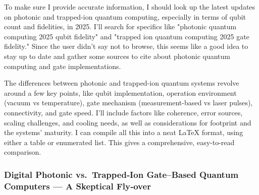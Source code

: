 \documentclass[11pt,a4paper]{article}
\begin{document}
To make sure I provide accurate information, I should look up the latest updates on photonic and trapped-ion quantum computing, especially in terms of qubit count and fidelities, in 2025. I'll search for specifics like "photonic quantum computing 2025 qubit fidelity" and "trapped ion quantum computing 2025 gate fidelity." Since the user didn't say not to browse, this seems like a good idea to stay up to date and gather some sources to cite about photonic quantum computing and gate implementations.

The differences between photonic and trapped-ion quantum systems revolve around a few key points, like qubit implementation, operation environment (vacuum vs temperature), gate mechanism (measurement-based vs laser pulses), connectivity, and gate speed. I'll include factors like coherence, error sources, scaling challenges, and cooling needs, as well as considerations for footprint and the systems' maturity. I can compile all this into a neat LaTeX format, using either a table or enumerated list. This gives a comprehensive, easy-to-read comparison.

\subsubsection{Digital Photonic vs.\ Trapped‑Ion Gate–Based Quantum Computers — A Skeptical Fly‑over}
\end{document}
